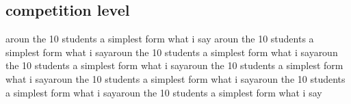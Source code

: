 \documentclass[12pt]{article}
\begin{document}
\subsection{competition level}
aroun the 10 students a simplest form what i say aroun the 10 students a simplest form what i sayaroun the 10 students a simplest form what i sayaroun the 10 students a simplest form what i sayaroun the 10 students a simplest form what i sayaroun the 10 students a simplest form what i sayaroun the 10 students a simplest form what i sayaroun the 10 students a simplest form what i say
\end{document}

